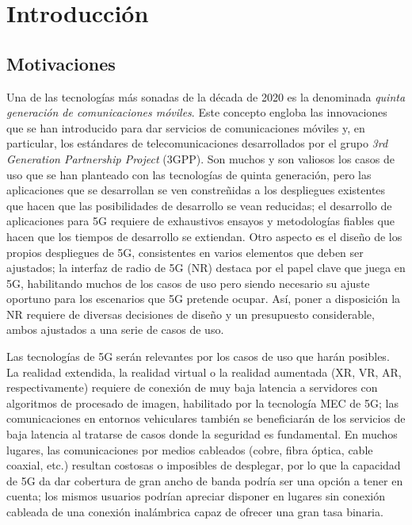 \documentclass[12pt]{report} %
\begin{document}
\chapter{Introducción}

\section{Motivaciones}

Una de las tecnologías más sonadas de la década de 2020 es la denominada \textit{quinta generación de comunicaciones móviles}.
Este concepto engloba las innovaciones que se han introducido para dar servicios de comunicaciones móviles y, en particular, los estándares de telecomunicaciones desarrollados por el grupo \textit{3rd Generation Partnership Project} (3GPP).
\cite{RefWorks:47}
Son muchos y son valiosos los casos de uso que se han planteado con las tecnologías de quinta generación,
pero las aplicaciones que se desarrollan se ven constreñidas a los despliegues existentes que hacen que las posibilidades de desarrollo se vean reducidas;
el desarrollo de aplicaciones para 5G requiere de exhaustivos ensayos y metodologías fiables que hacen que los tiempos de desarrollo se extiendan.
\cite{RefWorks:5, RefWorks:3}
Otro aspecto es el diseño de los propios despliegues de 5G, consistentes en varios elementos que deben ser ajustados;
la interfaz de radio de 5G (NR) destaca por el papel clave que juega en 5G, habilitando muchos de los casos de uso pero siendo necesario su ajuste oportuno para los escenarios que 5G pretende ocupar.
Así, poner a disposición la NR requiere de diversas decisiones de diseño y un presupuesto considerable, ambos ajustados a una serie de casos de uso.
\cite{RefWorks:5, RefWorks:3}

Las tecnologías de 5G serán relevantes por los casos de uso que harán posibles.
La realidad extendida, la realidad virtual o la realidad aumentada (XR, VR, AR, respectivamente) requiere de conexión de muy baja latencia a servidores con algoritmos de procesado de imagen, habilitado por la tecnología MEC de 5G;
\cite{RefWorks:5, RefWorks:3}
las comunicaciones en entornos vehiculares también se beneficiarán de los servicios de baja latencia al tratarse de casos donde la seguridad es fundamental.
\cite{RefWorks:25}
En muchos lugares, las comunicaciones por medios cableados (cobre, fibra óptica, cable coaxial, etc.) resultan costosas o imposibles de desplegar,
por lo que la capacidad de 5G da dar cobertura de gran ancho de banda podría ser una opción a tener en cuenta;
los mismos usuarios podrían apreciar disponer en lugares sin conexión cableada de una conexión inalámbrica capaz de ofrecer una gran tasa binaria.
\end{document}
